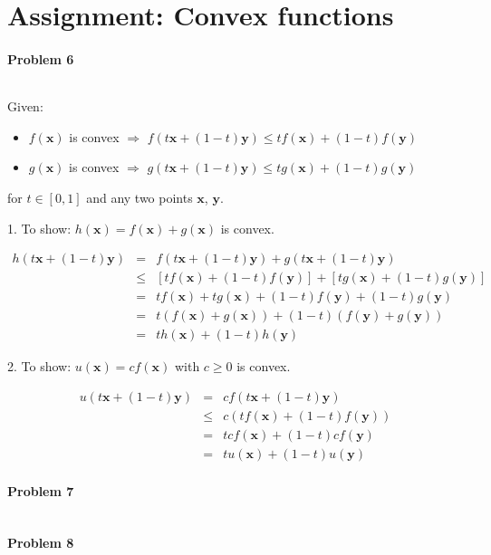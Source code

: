 \documentclass{article}
\renewcommand{\Vec}[1]{\ensuremath{\mathbf{#1}}}
\begin{document}
\section{Assignment: Convex functions}
\paragraph*{Problem 6}
$\;$ 

Given:
\begin{itemize}
\item $f(\Vec{x})$ is convex $\Rightarrow$ $f(t\Vec{x} + (1-t)\Vec{y}) \leq tf(\Vec{x})+(1-t)f(\Vec{y})$
\item $g(\Vec{x})$ is convex $\Rightarrow$ $g(t\Vec{x} + (1-t)\Vec{y}) \leq tg(\Vec{x})+(1-t)g(\Vec{y})$
\end{itemize}
for $t \in [0,1]$ and any two points $\Vec{x}$, $\Vec{y}$.

1. To show: $h(\Vec{x}) = f(\Vec{x}) + g(\Vec{x})$ is convex.

\begin{eqnarray}
h(t\Vec{x} + (1-t)\Vec{y}) &=& f(t\Vec{x} + (1-t)\Vec{y}) + g(t\Vec{x} + (1-t)\Vec{y})\\
&\leq& [tf(\Vec{x})+(1-t)f(\Vec{y})] + [tg(\Vec{x})+(1-t)g(\Vec{y})]\\
&=& tf(\Vec{x}) + tg(\Vec{x}) + (1-t)f(\Vec{y}) + (1-t)g(\Vec{y})\\
&=& t(f(\Vec{x}) + g(\Vec{x})) + (1-t)(f(\Vec{y}) + g(\Vec{y}))\\
&=& th(\Vec{x}) + (1-t)h(\Vec{y})
\end{eqnarray}

2. To show: $u(\Vec{x}) = cf(\Vec{x})$ with $c \geq 0$ is convex.

\begin{eqnarray}
u(t\Vec{x} + (1-t)\Vec{y}) &=& cf(t\Vec{x} + (1-t)\Vec{y})\\
&\leq& c(tf(\Vec{x})+(1-t)f(\Vec{y}))\\
&=& tcf(\Vec{x})+(1-t)cf(\Vec{y})\\
&=& tu(\Vec{x})+(1-t)u(\Vec{y})
\end{eqnarray}


\paragraph*{Problem 7}
$\;$ 

\paragraph*{Problem 8}
$\;$ 
\end{document}
